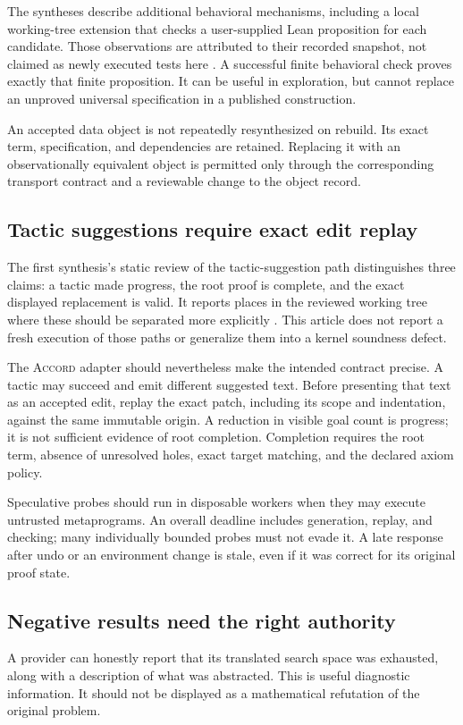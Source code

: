 \documentclass[11pt,a4paper]{article}
\newcommand{\Accord}{\textsc{Accord}}
\theoremstyle{definition}
\begin{document}
The syntheses describe additional behavioral mechanisms, including a local
working-tree extension that checks a user-supplied Lean proposition for each
candidate. Those observations are attributed to their recorded snapshot, not
claimed as newly executed tests here \cite{syn-a,syn-b}. A successful finite
behavioral check proves exactly that finite proposition. It can be useful in
exploration, but cannot replace an unproved universal specification in a
published construction.

An accepted data object is not repeatedly resynthesized on rebuild. Its exact
term, specification, and dependencies are retained. Replacing it with an
observationally equivalent object is permitted only through the corresponding
transport contract and a reviewable change to the object record.

\subsection{Tactic suggestions require exact edit replay}
The first synthesis's static review of the tactic-suggestion path distinguishes
three claims: a tactic made progress, the root proof is complete, and the exact
displayed replacement is valid. It reports places in the reviewed working tree
where these should be separated more explicitly \cite{syn-a}. This article does
not report a fresh execution of those paths or generalize them into a kernel
soundness defect.

The \Accord{} adapter should nevertheless make the intended contract precise.
A tactic may succeed and emit different suggested text. Before presenting that
text as an accepted edit, replay the exact patch, including its scope and
indentation, against the same immutable origin. A reduction in visible goal
count is progress; it is not sufficient evidence of root completion. Completion
requires the root term, absence of unresolved holes, exact target matching, and
the declared axiom policy.

Speculative probes should run in disposable workers when they may execute
untrusted metaprograms. An overall deadline includes generation, replay, and
checking; many individually bounded probes must not evade it. A late response
after undo or an environment change is stale, even if it was correct for its
original proof state.

\subsection{Negative results need the right authority}
A provider can honestly report that its translated search space was exhausted,
along with a description of what was abstracted. This is useful diagnostic
information. It should not be displayed as a mathematical refutation of the
original problem.
\end{document}
